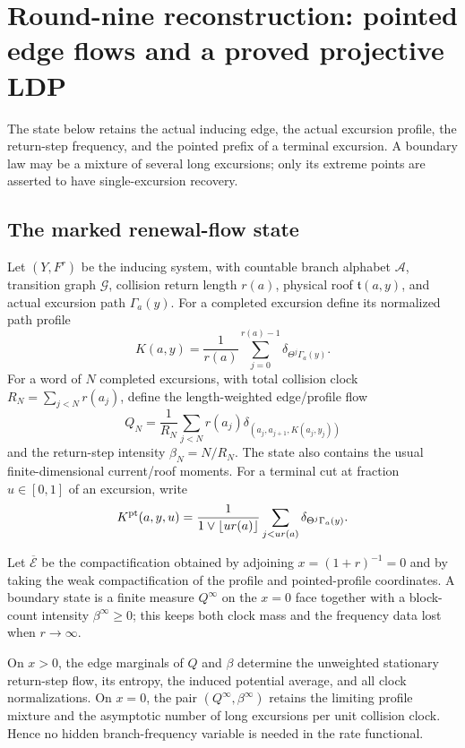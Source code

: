 \section{Round-nine reconstruction: pointed edge flows and a proved projective LDP}
\label{sec:r9-a3}

The state below retains the actual inducing edge, the actual excursion profile,
the return-step frequency, and the pointed prefix of a terminal excursion.  A
boundary law may be a mixture of several long excursions; only its extreme
points are asserted to have single-excursion recovery.

\subsection{The marked renewal-flow state}

Let $(Y,F^r)$ be the inducing system, with countable branch alphabet
$\mathcal A$, transition graph $\mathcal G$, collision return length $r(a)$,
physical roof $\mathfrak t(a,y)$, and actual excursion path
$\Gamma_a(y)$.  For a completed excursion define its normalized path profile
\[
 K(a,y)=\frac1{r(a)}\sum_{j=0}^{r(a)-1}
 \delta_{\Theta^j\Gamma_a(y)}.
\]
For a word of $N$ completed excursions, with total collision clock
$R_N=\sum_{j<N}r(a_j)$, define the length-weighted edge/profile flow
\[
 Q_N=\frac1{R_N}\sum_{j<N}r(a_j)
 \delta_{(a_j,a_{j+1},K(a_j,y_j))}
\]
and the return-step intensity $\beta_N=N/R_N$.  The state also contains the
usual finite-dimensional current/roof moments.  For a terminal cut at fraction
$u\in[0,1]$ of an excursion, write
\[
 K^{\rm pt}(a,y,u)=\frac1{1\vee\lfloor ur(a)\rfloor}
 \sum_{j<ur(a)}\delta_{\Theta^j\Gamma_a(y)}.
\]

Let $\overline{\mathcal E}$ be the compactification obtained by adjoining
$x=(1+r)^{-1}=0$ and by taking the weak compactification of the profile and
pointed-profile coordinates.  A boundary state is a finite measure
$Q^\infty$ on the $x=0$ face together with a block-count intensity
$\beta^\infty\ge0$; this keeps both clock mass and the frequency data lost when
$r\to\infty$.

\begin{lemma}
\label{lem:r9-a3-state}
On $x>0$, the edge marginals of $Q$ and $\beta$ determine the unweighted
stationary return-step flow, its entropy, the induced potential average, and
all clock normalizations.  On $x=0$, the pair $(Q^\infty,\beta^\infty)$ retains
the limiting profile mixture and the asymptotic number of long excursions per
unit collision clock.  Hence no hidden branch-frequency variable is needed in
the rate functional.
\end{lemma}


